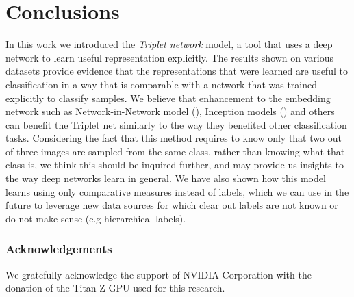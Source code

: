 \documentclass{article} %
\begin{document}
\section{Conclusions}
In this work we introduced the \emph{Triplet network} model, a tool that uses a deep network to learn useful representation explicitly.
The results shown on various datasets provide evidence that the representations that were learned are useful to classification in a way that is comparable with a network that was trained explicitly to classify samples. We believe that enhancement to the embedding network
such as Network-in-Network model (\citet{LinCY13}), Inception models (\citet{inception}) and others can benefit the Triplet net similarly to the way they benefited other classification tasks.
Considering the fact that this method requires to know only that two out of three images are sampled from the same class, rather than knowing what that class is, we think this should be inquired further, and may provide us insights
to the way deep networks learn in general.
We have also shown how this model learns using only comparative measures instead of labels, which we can use in the future to leverage new data sources for which clear out labels are not known or do not make sense (e.g hierarchical labels).
\subsubsection*{Acknowledgements}

We gratefully acknowledge the support of NVIDIA Corporation with the donation of the Titan-Z GPU used for this research.



\end{document}
